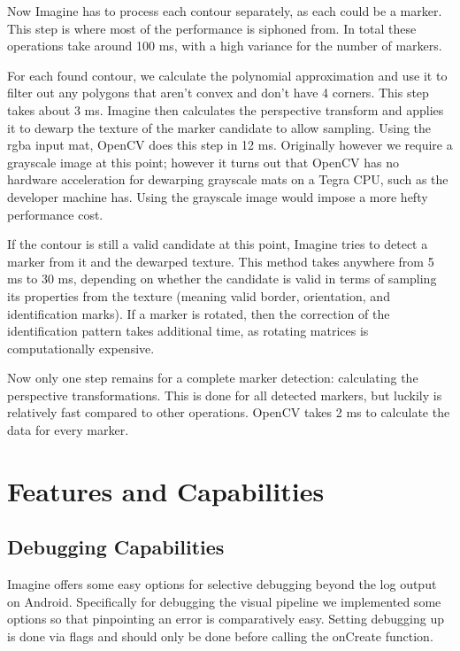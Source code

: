 Now Imagine has to process each contour separately, as each could be a marker.
This step is where most of the performance is siphoned from.
In total these operations take around 100 ms, with a high variance for the number of markers.

For each found contour, we calculate the polynomial approximation and use it to filter out any polygons that aren't convex and don't have 4 corners.
This step takes about 3 ms.
Imagine then calculates the perspective transform and applies it to dewarp the texture of the marker candidate to allow sampling.
Using the rgba input mat, OpenCV does this step in 12 ms.
Originally however we require a grayscale image at this point; however it turns out that OpenCV has no hardware acceleration for dewarping grayscale mats on a Tegra CPU, such as the developer machine has.
Using the grayscale image would impose a more hefty performance cost.

If the contour is still a valid candidate at this point, Imagine tries to detect a marker from it and the dewarped texture.
This method takes anywhere from 5 ms to 30 ms, depending on whether the candidate is valid in terms of sampling its properties from the texture (meaning valid border, orientation, and identification marks).
If a marker is rotated, then the correction of the identification pattern takes additional time, as rotating matrices is computationally expensive.

Now only one step remains for a complete marker detection: calculating the perspective transformations.
This is done for all detected markers, but luckily is relatively fast compared to other operations.
OpenCV takes 2 ms to calculate the data for every marker.

\section{Features and Capabilities}

\subsection{Debugging Capabilities}

Imagine offers some easy options for selective debugging beyond the log output on Android.
Specifically for debugging the visual pipeline we implemented some options so that pinpointing an error is comparatively easy.
Setting debugging up is done via flags and should only be done before calling the onCreate function.

